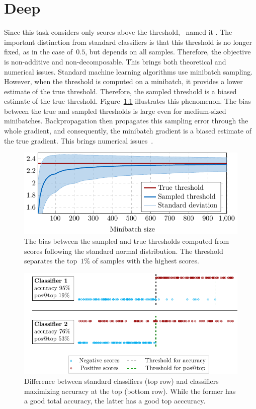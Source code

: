 \chapter{Deep}

Since this task considers only scores above the threshold,~\cite{boyd2012accuracy} named it \AccatTop. The important distinction from standard classifiers is that this threshold is no longer fixed, as in the case of~$0.5$, but depends on all samples. Therefore, the objective is non-additive and non-decomposable. This brings both theoretical and numerical issues. Standard machine learning algorithms use minibatch sampling. However, when the threshold is computed on a minibatch, it provides a lower estimate of the true threshold. Therefore, the sampled threshold is a biased estimate of the true threshold. Figure~\ref{fig:thresholds1} illustrates this phenomenon. The bias between the true and sampled thresholds is large even for medium-sized minibatches. Backpropagation then propagates this sampling error through the whole gradient, and consequently, the minibatch gradient is a biased estimate of the true gradient. This brings numerical issues~\cite{bottou2018optimization}.

\begin{figure}[!ht]
  \centering
  \includegraphics[width = \linewidth]{images/deep_threshold_bias.pdf}
  \caption{The bias between the sampled and true thresholds computed from scores following the standard normal distribution. The threshold separates the top~$1\%$ of samples with the highest scores.}
  \label{fig:thresholds1}
\end{figure}

\begin{figure}[!ht]
  \centering
  \includegraphics[width = \linewidth]{images/standard_aatp_comparison.pdf}
  \caption{Difference between standard classifiers (top row) and classifiers maximizing accuracy at the top (bottom row). While the former has a good total accuracy, the latter has a good top acccuracy.}
  \label{fig:difference}
\end{figure}

